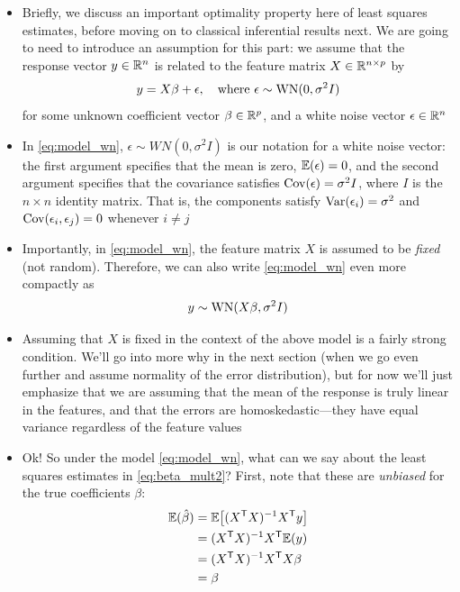 \documentclass{article}
\begin{document}
\begin{itemize}
\item Briefly, we discuss an important optimality property here of least squares
  estimates, before moving on to classical inferential results next. We are
  going to need to introduce an assumption for this part: we assume that the
  response vector $y \in \mathbb{R}^n$ is related to the feature matrix $X \in \mathbb{R}^{n
    \times p}$ by
  \begin{equation}
  \label{eq:model_wn}
  y = X \beta + \epsilon, \quad \text{where $\epsilon \sim \mathrm{WN}(0, \sigma^2 I)$}   
  \end{equation}
  for some unknown coefficient vector $\beta \in \mathbb{R}^p$, and a white noise vector 
  $\epsilon \in \mathbb{R}^n$

\item In \eqref{eq:model_wn}, $\epsilon \sim WN(0, \sigma^2 I)$ is our notation
  for a white noise vector: the first argument specifies that the mean is zero, 
  $\mathbb{E}(\epsilon) = 0$, and the second argument specifies that the covariance
  satisfies $\operatorname{Cov}(\epsilon) = \sigma^2 I$, where $I$ is the $n \times n$
  identity matrix. That is, the components satisfy $\operatorname{Var}(\epsilon_i) = \sigma^2$
  and $\operatorname{Cov}(\epsilon_i, \epsilon_j) = 0$ whenever $i \not= j$

\item Importantly, in \eqref{eq:model_wn}, the feature matrix $X$ is assumed to
  be \emph{fixed} (not random). Therefore, we can also write \eqref{eq:model_wn}
  even more compactly as 
  \[
  y \sim \mathrm{WN}(X \beta, \sigma^2 I)
  \]

\item Assuming that $X$ is fixed in the context of the above model is a fairly
  strong condition. We'll go into more why in the next section (when we go even 
  further and assume normality of the error distribution), but for now we'll
  just emphasize that we are assuming that the mean of the response is truly
  linear in the features, and that the errors are homoskedastic---they have
  equal variance regardless of the feature values 

\item Ok! So under the model \eqref{eq:model_wn}, what can we say about the
  least squares estimates in \eqref{eq:beta_mult2}? First, note that these are 
  \emph{unbiased} for the true coefficients $\beta$:
  \begin{align*}
  \mathbb{E}(\hat{\beta}) &= \mathbb{E} \big[ (X^{\mathsf{T}} X)^{-1} X^{\mathsf{T}} y \big] \\
  &= (X^{\mathsf{T}} X)^{-1} X^{\mathsf{T}} \mathbb{E}(y) \\
  &= (X^{\mathsf{T}} X)^{-1} X^{\mathsf{T}} X \beta \\
  &= \beta
  \end{align*}


\end{itemize}
\end{document}
